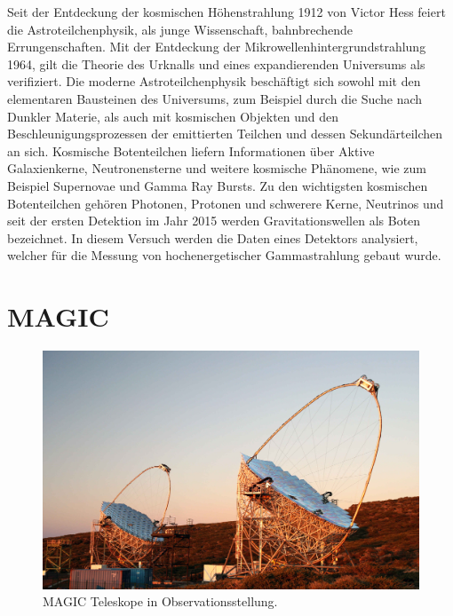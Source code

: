 Seit der Entdeckung der kosmischen Höhenstrahlung 1912
von Victor Hess feiert die Astroteilchenphysik,
als junge Wissenschaft,
bahnbrechende Errungenschaften.
Mit der Entdeckung der Mikrowellenhintergrundstrahlung 1964,
gilt die Theorie des Urknalls
und eines expandierenden Universums als verifiziert.
Die moderne Astroteilchenphysik beschäftigt sich sowohl mit den
elementaren Bausteinen des Universums,
zum Beispiel durch die Suche nach Dunkler Materie,
als auch mit kosmischen Objekten
und den Beschleunigungsprozessen der emittierten Teilchen
und dessen Sekundärteilchen an sich.
Kosmische Botenteilchen liefern Informationen über
Aktive Galaxienkerne,
Neutronensterne
und weitere kosmische Phänomene,
wie zum Beispiel Supernovae und Gamma Ray Bursts.
Zu den wichtigsten kosmischen Botenteilchen gehören Photonen,
Protonen
und schwerere Kerne,
Neutrinos
und seit der ersten Detektion im Jahr 2015 werden Gravitationswellen als Boten
bezeichnet.
In diesem Versuch werden die Daten eines Detektors analysiert,
welcher für die Messung von hochenergetischer Gammastrahlung gebaut wurde.


\section*{MAGIC}%
\label{sec:magic}

\begin{figure}
		\includegraphics[width=\linewidth]{pictures/magic.JPG}
		\caption{MAGIC Teleskope in Observationsstellung.}%
		\label{fig:magic}
\end{figure}

